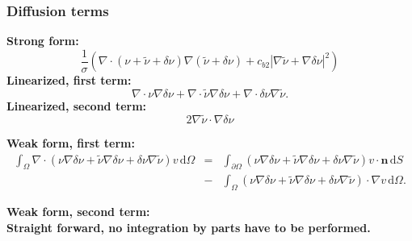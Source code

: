 \documentclass[twoside, 11pt, a4paper]{article}
\newcommand{\dee}{\mathrm{d}}
\begin{document}
\subsubsection*{Diffusion terms}
\bf Strong form:\rm
\begin{equation}
  \frac{1}{\sigma}\left(\nabla\cdot\left(\nu+\tilde{\nu}+\delta\nu\right)\nabla\left(\tilde{\nu}+\delta\nu\right)+c_{b2}\left|\nabla\tilde{\nu}+\nabla\delta\nu\right|^2\right)
\end{equation}
\bf Linearized, first term:\rm
\begin{equation}
  \nabla\cdot\nu\nabla\delta\nu + \nabla\cdot\tilde{\nu}\nabla\delta\nu + \nabla\cdot\delta\nu\nabla\tilde{\nu}.
\end{equation}
\bf Linearized, second term:\rm
\begin{equation}
  2\nabla\tilde{\nu}\cdot\nabla\delta\nu
\end{equation}

\bf Weak form, first term:\rm
\begin{equation}
  \begin{aligned}
    \int_\Omega \nabla \cdot \left(\nu\nabla\delta\nu + \tilde{\nu}\nabla\delta\nu + \delta\nu\nabla\tilde{\nu}\right)v\,\dee\Omega &=&
    \int_{\partial\Omega} \left(\nu\nabla\delta\nu + \tilde{\nu}\nabla\delta\nu + \delta\nu\nabla\tilde{\nu}\right)v\cdot \mathbf{n}\,\dee S \\
    &-&\int_\Omega \left(\nu\nabla\delta\nu + \tilde{\nu}\nabla\delta\nu + \delta\nu\nabla\tilde{\nu}\right)\cdot \nabla v\,\dee\Omega.
   \end{aligned}
\end{equation}

\bf Weak form, second term:\rm \\
Straight forward, no integration by parts have to be performed.
\end{document}
